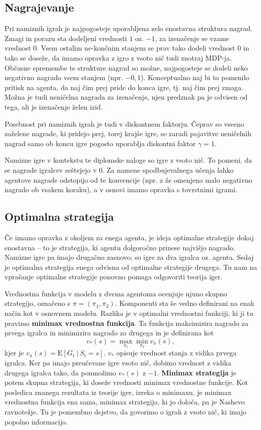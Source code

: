 \documentclass[12pt,a4paper]{amsart}
\theoremstyle{definition} %
\theoremstyle{plain} %
\begin{document}
\subsection{Nagrajevanje}
Pri namiznih igrah je najpogosteje uporabljena zelo enostavna struktura nagrad. Zmagi in porazu sta 
dodeljeni vrednosti $1$ oz. $-1$, za izenačenje se vzame vrednost $0$. Vsem ostalim ne-končnim stanjem
se prav tako dodeli vrednost $0$ in tako se doseže, da imamo opravka z igro z vsoto nič tudi znotraj 
MDP-ja. Občasne spremembe te strukture nagrad so možne, najpogosteje se dodeli neko negativno nagrado 
vsem stanjem (npr. $-0,1$). Konceptualno naj bi to pomenilo pritisk na agenta, da naj čim prej pride do 
konca igre, tj. naj čim prej zmaga. Možna je tudi neničelna nagrada za izenačenje, njen predznak pa je 
odvisen od tega, ali je izenačenje želen izid. 

Posebnost pri namiznih igrah je tudi v diskontnem faktorju. Čeprav so vseeno zaželene nagrade, ki 
pridejo prej, torej krajše igre, se zaradi pojavitve neničelnih nagrad samo ob koncu igre pogosto 
uporablja diskontni faktor $\gamma = 1$.

Namizne igre v kontekstu te diplomske naloge so igre z vsoto nič. To pomeni, da se nagrade igralcev 
seštejejo v $0$. Za namene spodbujevalnega učenja lahko agentove nagrade odstopijo od te konvencije
(npr. z že omenjeno malo negativno nagrado ob vsakem koraku), a v osnovi imamo opravka s tovrstnimi 
igrami.

\subsection{Optimalna strategija}
Če imamo opravka z okoljem za enega agenta, je ideja optimalne strategije dokaj enostavna -- to
je strategija, ki agentu dolgoročno prinese najvišjo nagrado. Namizne igre pa imajo drugačno zasnovo; 
so igre za dva igralca oz. agenta. Sedaj je optimalna strategija enega odvisna od optimalne strategije 
drugega. Tu nam na vprašanje optimalne strategije ponovno pomaga odgovoriti teorija iger. 

Vrednostna funkcija v modelu z dvema agentoma ocenjuje njuno skupno strategijo, označeno s $\pi = (\pi_1, 
\pi_2)$. Komponenti sta še vedno definirani na enak način kot v osnovnem modelu. Razlika je v optimalni 
vrednostni funkciji, ki ji tu pravimo \textbf{minimax vrednostna funkcija}. Ta funkcija maksimizira 
nagrado za prvega igralca in minimizira nagrado za drugega in je definirana kot
$$
v_*(s) = \max_{\pi_1} \min_{\pi_2} v_\pi(s), 
$$
kjer je $v_\pi(s) = \mathrm{E} [G_t~|~S_t = s]$. $v_*$ opisuje vrednost stanja z vidika prvega 
igralca. Ker pa imajo preučevane igre vsoto nič, dobimo vrednost z vidika drugega igralca tako, da 
pomnožimo $v_*(s)$ z $-1$. \textbf{Minimax strategija} je potem skupna strategija, 
ki doseže vrednosti minimax vrednostne funkcije. Kot posledica znanega rezultata iz teorije iger, 
izreka o minimaxu, je minimax vrednostna funkcija ena sama, minimax strategija, ki jo določa, pa je 
Nashevo ravnotežje. Tu je pomembno dejstvo, da govorimo o igrah z vsoto nič, ki imajo popolno 
informacijo.
\end{document}
